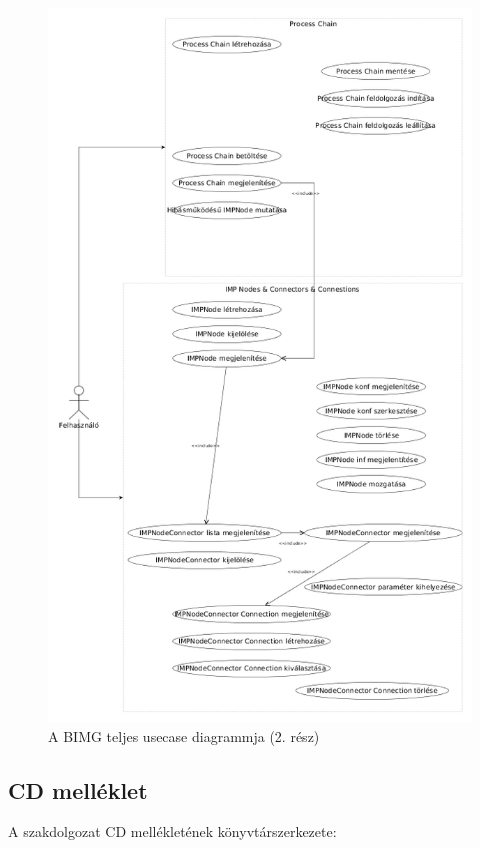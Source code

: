 \documentclass[a4paper,12pt,oneside]{report}
\begin{document}
\begin{figure}[h]
  \includegraphics[width=\textwidth]{usecase_part_2.png}
  \caption{A BIMG teljes usecase diagrammja (2. rész) }
  \label{fig:bimg_usecase_schema_part_2}
\end{figure}

\subsection{CD melléklet}
A szakdolgozat CD mellékletének könyvtárszerkezete:
\end{document}
